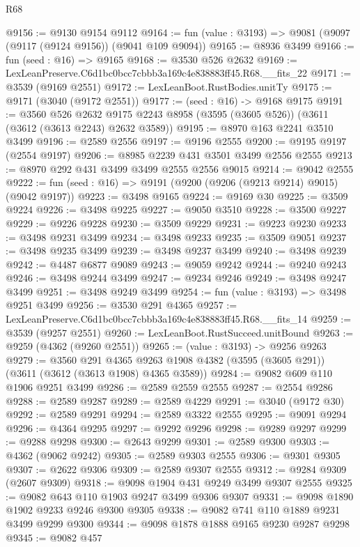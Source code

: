 \begin{lexlean}{R68}
\begin{coremodule}
@9156 := @9130 @9154 @9112
@9164 := fun (value : @3193) => @9081 (@9097 (@9117 (@9124 @9156)) (@9041 @109 @9094))
@9165 := @8936 @3499
@9166 := fun (seed : @16) => @9165
@9168 := @3530 @526 @2632
@9169 := LexLeanPreserve.C6d1bc0bcc7cbbb3a169c4e838883ff45.R68.__fits_22
@9171 := @3539 (@9169 @2551)
@9172 := LexLeanBoot.RustBodies.unitTy
@9175 := @9171 (@3040 (@9172 @2551))
@9177 := (seed : @16) -> @9168 @9175
@9191 := @3560
    @526
    @2632
    @9175
    @2243
    @8958
    (@3595 (@3605 @526))
    (@3611 (@3612 (@3613 @2243) @2632 @3589))
@9195 := @8970 @163 @2241 @3510 @3499
@9196 := @2589 @2556
@9197 := @9196 @2555
@9200 := @9195 @9197 (@2554 @9197)
@9206 := @8985 @2239 @431 @3501 @3499 @2556 @2555
@9213 := @8970 @292 @431 @3499 @3499 @2555 @2556 @9015
@9214 := @9042 @2555
@9222 := fun (seed : @16) => @9191 (@9200 (@9206 (@9213 @9214) @9015) (@9042 @9197))
@9223 := @3498 @9165
@9224 := @9169 @30
@9225 := @3509 @9224
@9226 := @3498 @9225
@9227 := @9050 @3510
@9228 := @3500 @9227
@9229 := @9226 @9228
@9230 := @3509 @9229
@9231 := @9223 @9230
@9233 := @3498 @9231 @3499
@9234 := @3498 @9233
@9235 := @3509 @9051
@9237 := @3498 @9235 @3499
@9239 := @3498 @9237 @3499
@9240 := @3498 @9239
@9242 := @4487 @6877 @9089
@9243 := @9059 @9242
@9244 := @9240 @9243
@9246 := @3498 @9244 @3499
@9247 := @9234 @9246
@9249 := @3498 @9247 @3499
@9251 := @3498 @9249 @3499
@9254 := fun (value : @3193) => @3498 @9251 @3499
@9256 := @3530 @291 @4365
@9257 := LexLeanPreserve.C6d1bc0bcc7cbbb3a169c4e838883ff45.R68.__fits_14
@9259 := @3539 (@9257 @2551)
@9260 := LexLeanBoot.RustSucceed.unitBound
@9263 := @9259 (@4362 (@9260 @2551))
@9265 := (value : @3193) -> @9256 @9263
@9279 := @3560
    @291
    @4365
    @9263
    @1908
    @4382
    (@3595 (@3605 @291))
    (@3611 (@3612 (@3613 @1908) @4365 @3589))
@9284 := @9082 @609 @110 @1906 @9251 @3499
@9286 := @2589 @2559 @2555
@9287 := @2554 @9286
@9288 := @2589 @9287
@9289 := @2589 @4229
@9291 := @3040 (@9172 @30)
@9292 := @2589 @9291
@9294 := @2589 @3322 @2555
@9295 := @9091 @9294
@9296 := @4364 @9295
@9297 := @9292 @9296
@9298 := @9289 @9297
@9299 := @9288 @9298
@9300 := @2643 @9299
@9301 := @2589 @9300
@9303 := @4362 (@9062 @9242)
@9305 := @2589 @9303 @2555
@9306 := @9301 @9305
@9307 := @2622 @9306
@9309 := @2589 @9307 @2555
@9312 := @9284 @9309 (@2607 @9309)
@9318 := @9098 @1904 @431 @9249 @3499 @9307 @2555
@9325 := @9082 @643 @110 @1903 @9247 @3499 @9306 @9307
@9331 := @9098 @1890 @1902 @9233 @9246 @9300 @9305
@9338 := @9082 @741 @110 @1889 @9231 @3499 @9299 @9300
@9344 := @9098 @1878 @1888 @9165 @9230 @9287 @9298
@9345 := @9082 @457

\end{coremodule}
\end{lexlean}
